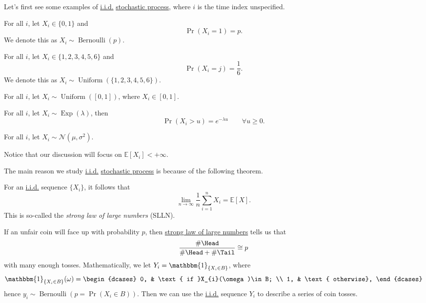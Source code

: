 Let's first see some examples of \hyperref[def:i.i.d.]{i.i.d.} \hyperref[def:stochastic-process]{stochastic process}, where \(i\) is the time index unspecified.
\begin{eg}
	For all \(i\), let \(X_{i}\in\{0, 1\}\) and
	\[
		\Pr(X_{i} = 1) = p.
	\]
	We denote this as \(X_i\sim \operatorname{Bernoulli}(p)\).
\end{eg}

\begin{eg}
	For all \(i\), let \(X_{i}\in\{1, 2, 3, 4, 5, 6\}\) and
	\[
		\Pr(X_{i} = j) = \frac{1}{6}.
	\]
	We denote this as \(X_i\sim \operatorname{Uniform}(\{1, 2, 3, 4, 5, 6\})\).
\end{eg}

\begin{eg}
	For all \(i\), let \(X_i\sim \operatorname{Uniform}(\left[ 0, 1 \right] )\), where \(X_{i}\in\left[ 0, 1 \right] \).
\end{eg}

\begin{eg}
	For all \(i\), let \(X_i\sim \operatorname{Exp}(\lambda)\), then
	\[
		\Pr(X_{i}>u) = e^{-\lambda u}\qquad \forall u\geq 0.
	\]
\end{eg}

\begin{eg}
	For all \(i\), let \(X_i\sim \mathcal{N}(\mu, \sigma^2)\).
\end{eg}

\begin{remark}
	Notice that our discussion will focus on \(\mathbb{E}\left[X_i \right] < +\infty \).
\end{remark}

The main reason we study \hyperref[def:i.i.d.]{i.i.d.} \hyperref[def:stochastic-process]{stochastic process} is because of the following theorem.
\begin{theorem}\label{thm:SLLN}
	For an \hyperref[def:i.i.d.]{i.i.d.} sequence \(\{X_i\}\), it follows that
	\[
		\lim_{n \to \infty} \frac{1}{n}\sum\limits_{i=1}^{n} X_{i} = \mathbb{E}\left[X \right].
	\]
	This is so-called the \emph{strong law of large numbers} (SLLN).
\end{theorem}

\begin{eg}
	If an unfair coin will face up with probability \(p\), then \hyperref[thm:SLLN]{strong law of large numbers} tells us that
	\[
		\frac{\# \Head }{\# \Head + \# \Tail } \cong p
	\]
	with many enough tosses. Mathematically, we let \(Y_{i} = \mathbbm{1}_{\{X_{i}\in B\}}\), where
	\[
		\mathbbm{1}_{\{X_{i}\in B\}}(\omega) = \begin{dcases}
			0, & \text{ if }X_{i}(\omega)\in B; \\
			1, & \text{ otherwise},
		\end{dcases}
	\]
	hence \(y_{i}\sim \operatorname{Bernoulli}(p = \Pr(X_{i}\in B))\). Then we can use the \hyperref[def:i.i.d.]{i.i.d.} sequence \(Y_i\) to describe a series of coin tosses.
\end{eg}


